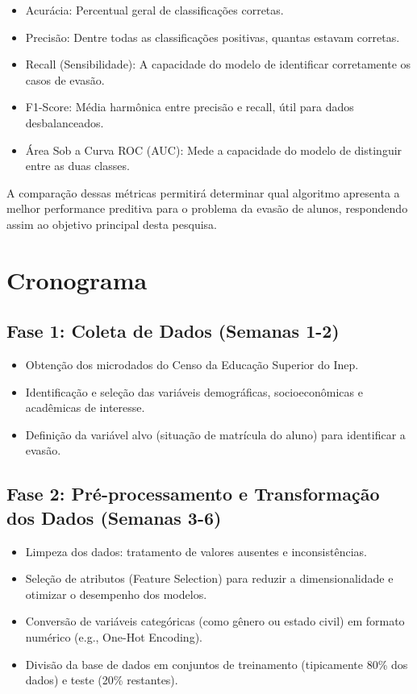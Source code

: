 \documentclass[english, spanish, brazilian]{RBIEarticle} %
\begin{document}
\begin{itemize}
    \item Acurácia: Percentual geral de classificações corretas.
    \item Precisão: Dentre todas as classificações positivas, quantas estavam corretas.
    \item Recall (Sensibilidade): A capacidade do modelo de identificar corretamente os casos de evasão.
    \item F1-Score: Média harmônica entre precisão e recall, útil para dados desbalanceados.
    \item Área Sob a Curva ROC (AUC): Mede a capacidade do modelo de distinguir entre as duas classes.
\end{itemize}

A comparação dessas métricas permitirá determinar qual algoritmo apresenta a melhor performance preditiva para o problema da evasão de alunos, respondendo assim ao objetivo principal desta pesquisa.


\section{Cronograma}

\subsection{Fase 1: Coleta de Dados (Semanas 1-2)}

\begin{itemize}
    \item Obtenção dos microdados do Censo da Educação Superior do Inep.
    \item Identificação e seleção das variáveis demográficas, socioeconômicas e acadêmicas de interesse.
    \item Definição da variável alvo (situação de matrícula do aluno) para identificar a evasão.
\end{itemize}


\subsection{Fase 2: Pré-processamento e Transformação dos Dados (Semanas 3-6)}

\begin{itemize}
    \item Limpeza dos dados: tratamento de valores ausentes e inconsistências.
    \item Seleção de atributos (Feature Selection) para reduzir a dimensionalidade e otimizar o desempenho dos modelos.
    \item Conversão de variáveis categóricas (como gênero ou estado civil) em formato numérico (e.g., One-Hot Encoding).
    \item Divisão da base de dados em conjuntos de treinamento (tipicamente 80\% dos dados) e teste (20\% restantes).
\end{itemize}
\end{document}
